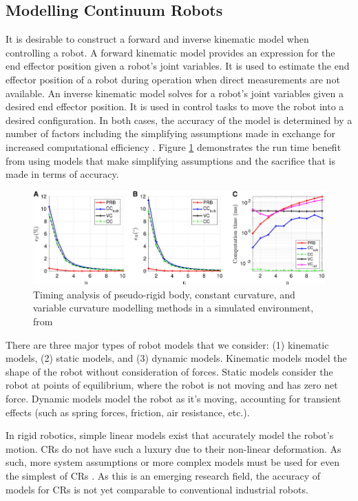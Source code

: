 \subsection{Modelling Continuum Robots}
\label{sec:modelling_methods}
It is desirable to construct a forward and inverse kinematic model when controlling a robot. A forward kinematic model provides an expression for the end effector position given a robot's joint variables. It is used to estimate the end effector position of a robot during operation when direct measurements are not available. An inverse kinematic model solves for a robot's joint variables given a desired end effector position. It is used in control tasks to move the robot into a desired configuration. In both cases, the accuracy of the model is determined by a number of factors including the simplifying assumptions made in exchange for increased computational efficiency \cite{10.3389/frobt.2020.630245}. Figure \ref{fig:timing_from_source} demonstrates the run time benefit from using models that make simplifying assumptions and the sacrifice that is made in terms of accuracy. 

\begin{figure}[h]
    \centering
    \includegraphics[width=\textwidth]{images/time_graph_from_survey.jpg}
    \caption{Timing analysis of pseudo-rigid body, constant curvature, and variable curvature modelling methods in a simulated environment, from \cite{10.3389/frobt.2020.630245}}
    \label{fig:timing_from_source}
\end{figure}

There are three major types of robot models that we consider: (1) kinematic models, (2) static models, and (3) dynamic models. Kinematic models model the shape of the robot without consideration of forces. Static models consider the robot at points of equilibrium, where the robot is not moving and has zero net force. Dynamic models model the robot as it's moving, accounting for transient effects (such as spring forces, friction, air resistance, etc.). 

In rigid robotics, simple linear models exist that accurately model the robot's motion. CRs do not have such a luxury due to their non-linear deformation. As such, more system assumptions or more complex models must be used for even the simplest of CRs \cite{10.3389/frobt.2020.630245}. As this is an emerging research field, the accuracy of models for CRs is not yet comparable to conventional industrial robots. 

